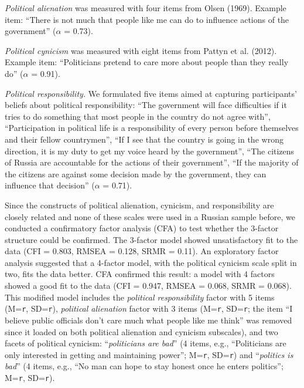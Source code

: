 \documentclass[
]{article}
\begin{document}
\emph{Political alienation} was measured with four items from Olsen (1969). Example item: ``There is not much that people like me can do to influence actions of the government'' (\(\alpha\) = 0.73).

\emph{Political cynicism} was measured with eight items from Pattyn et al. (2012). Example item: ``Politicians pretend to care more about people than they really do'' (\(\alpha\) = 0.91).

\emph{Political responsibility.} We formulated five items aimed at capturing participants' beliefs about political responsibility: ``The government will face difficulties if it tries to do something that most people in the country do not agree with'', ``Participation in political life is a responsibility of every person before themselves and their fellow countrymen'', ``If I see that the country is going in the wrong direction, it is my duty to get my voice heard by the government'', ``The citizens of Russia are accountable for the actions of their government'', ``If the majority of the citizens are against some decision made by the government, they can influence that decision'' (\(\alpha\) = 0.71).

Since the constructs of political alienation, cynicism, and responsibility are closely related and none of these scales were used in a Russian sample before, we conducted a confirmatory factor analysis (CFA) to test whether the 3-factor structure could be confirmed. The 3-factor model showed unsatisfactory fit to the data (CFI = 0.803, RMSEA = 0.128, SRMR = 0.11). An exploratory factor analysis suggested that a 4-factor model, with the political cynicism scale split in two, fits the data better. CFA confirmed this result: a model with 4 factors showed a good fit to the data (CFI = 0.947, RMSEA = 0.068, SRMR = 0.068). This modified model includes the \emph{political responsibility} factor with 5 items (M=\texttt{r}, SD=\texttt{r}), \emph{political alienation} factor with 3 items (M=\texttt{r}, SD=\texttt{r}; the item ``I believe public officials don't care much what people like me think'' was removed since it loaded on both political alienation and cynicism subscales), and two facets of political cynicism: ``\emph{politicians are bad}'' (4 items, e.g., ``Politicians are only interested in getting and maintaining power''; M=\texttt{r}, SD=\texttt{r}) and ``\emph{politics is bad}'' (4 items, e.g., ``No man can hope to stay honest once he enters politics''; M=\texttt{r}, SD=\texttt{r}).
\end{document}

